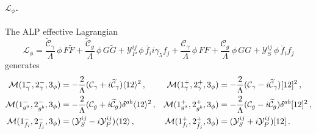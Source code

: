 \begin{subappendices}
\paragraph{\texorpdfstring{$\mathcal L_{\phi}$}{L phi}.}
The ALP effective Lagrangian
\begin{equation}
    \mathcal{L}_\phi =
    \frac{\widetilde{\mathcal{C}}_\gamma}{\Lambda}\,\phi\, F\widetilde F
    + \frac{\widetilde{\mathcal{C}}_g}{\Lambda}\,\phi\, G\widetilde G
    + \mathcal{Y}^{ij}_P\,\phi\, \bar{f}_i i\gamma_5 f_j
     + \frac{\mathcal{C}_\gamma}{\Lambda}\,\phi\, FF
    + \frac{\mathcal{C}_g}{\Lambda}\,\phi\, GG
    + \mathcal{Y}^{ij}_S\,\phi\, \bar{f}_i f_j
\end{equation}
generates
\begin{align}
    \mathcal M(1^-_\gamma,2^-_\gamma,3_\phi) &= -\frac{2}{\Lambda}(\mathcal C_\gamma + i \widetilde{\mathcal{C}}_\gamma)\langle 1 2 \rangle^2\,, &
    \mathcal M(1^+_\gamma,2^+_\gamma,3_\phi) &= -\frac{2}{\Lambda}(\mathcal C_\gamma - i \widetilde{\mathcal{C}}_\gamma)\lbrack 1 2 \rbrack^2\,, \\
    \mathcal M(1^-_{g^a},2^-_{g^b},3_\phi) &= -\frac{2}{\Lambda}(\mathcal C_g + i \widetilde{\mathcal{C}}_g)\delta^{ab}\langle 1 2 \rangle^2\,, &
    \mathcal M(1^+_{g^a},2^+_{g^b},3_\phi) &= -\frac{2}{\Lambda}(\mathcal C_g - i \widetilde{\mathcal{C}}_g)\delta^{ab}\lbrack 1 2 \rbrack^2\,, \\
    \mathcal M(1^-_{f_i},2^-_{\bar f_j},3_\phi)&=(\mathcal Y_S^{ij}-i\mathcal Y_P^{ij})\langle 1 2 \rangle\,, &
    \mathcal M(1^+_{f_i},2^+_{\bar f_j},3_\phi)&=(\mathcal Y_S^{ij}+i\mathcal Y_P^{ij})\lbrack 1 2 \rbrack \,.
\end{align}


\end{subappendices}
